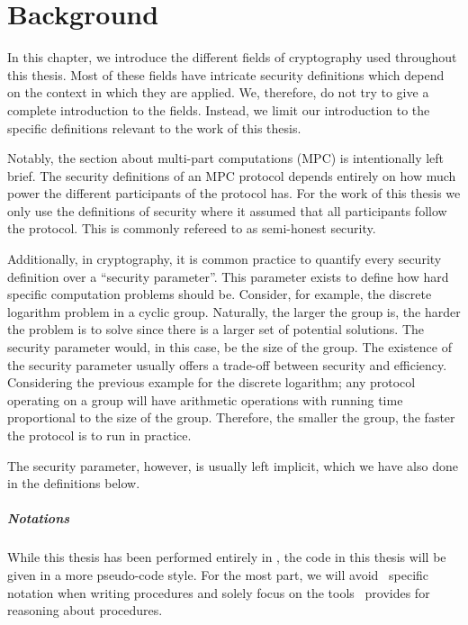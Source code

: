 \chapter{Background}
\label{ch:background}
In this chapter, we introduce the different fields of cryptography used
throughout this thesis.
Most of these fields have intricate security definitions which depend on the
context in which they are applied.
We, therefore, do not try to give a complete introduction to the fields.
Instead, we limit our introduction to the specific definitions relevant to the work of this thesis.

Notably, the section about multi-part computations (MPC) is intentionally left
brief.
The security definitions of an MPC protocol depends entirely on how much power
the different participants of the protocol has. For the work of this thesis we
only use the definitions of security where it assumed that all participants
follow the protocol. This is commonly refereed to as semi-honest security.

Additionally, in cryptography, it is common practice to quantify every security
definition over a ``security parameter''. This parameter exists to define how
hard specific computation problems should be. Consider, for example, the discrete
logarithm problem in a cyclic group. Naturally, the larger the group is,
the harder the problem is to solve since there is a larger set of potential solutions. The
security parameter would, in this case, be the size of the group.
The existence of the security parameter usually offers a trade-off between
security and efficiency. Considering the previous example for the discrete
logarithm; any protocol operating on a group will have arithmetic operations
with running time proportional to the size of the group. Therefore, the smaller
the group, the faster the protocol is to run in practice.

The security parameter, however, is usually left implicit, which we have also
done in the definitions below.

\paragraph{Notations}
While this thesis has been performed entirely in \easycrypt, the code in this
thesis will be given in a more pseudo-code style. For
the most part, we will avoid \easycrypt\ specific notation when writing procedures
and solely focus on the tools \easycrypt\ provides for reasoning about procedures.

